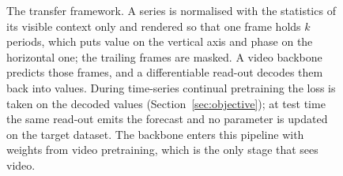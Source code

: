 \begin{figure}[t]
\caption{The transfer framework. A series is normalised with the statistics of its visible context
only and rendered so that one frame holds $k$ periods, which puts value on the vertical axis and
phase on the horizontal one; the trailing frames are masked. A video backbone predicts those frames,
and a differentiable read-out decodes them back into values. During time-series continual
pretraining the loss is taken on the decoded values (Section~\ref{sec:objective}); at test time the
same read-out emits the forecast and no parameter is updated on the target dataset. The backbone
enters this pipeline with weights from video pretraining, which is the only stage that sees video.}
\label{fig:overview}
\end{figure}
